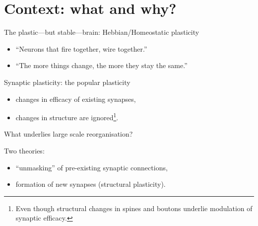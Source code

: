 \begin{frame}
  \titlepage{}
\end{frame}

\section{Context: what and why?}
\begin{frame}[c]{The plastic---but stable---brain: Hebbian/Homeostatic plasticity}
  \pause{}
  \begin{itemize}
    \item \enquote{Neurons that fire together, wire together.}\footnotemark[1]{}
      \pause{}
    \item \enquote{The more things change, the more they stay the same.}\footnotemark[2]{}
  \end{itemize}
\end{frame}
\begin{frame}[c]{Synaptic plasticity: the popular plasticity}
  \begin{itemize}
    \item changes in efficacy of \alert{existing} synapses,
      \pause{}
    \item changes in structure are ignored\footnote[1]{Even though structural changes in spines and boutons underlie modulation of synaptic efficacy.}.
  \end{itemize}
\end{frame}
\begin{frame}[c]{What underlies large scale reorganisation?}
  \begin{itemize}
    \item {}
  \pause{}
  \scriptsize{
      \item {}
      \item {}
      \item {}
      \item {}
      \item {}
      }
  \end{itemize}
\end{frame}
\begin{frame}[c]{Two theories:}
  \begin{itemize}
    \item \enquote{unmasking} of pre-existing synaptic connections,
      \pause{}
    \item formation of new synapses (\alert{structural plasticity}).
  \end{itemize}
\end{frame}
